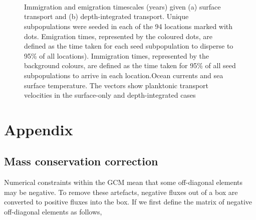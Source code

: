 \documentclass[12pt]{article}
\begin{document}
\begin{figure}[htp]
        \centering
\begin{subfigure}{.66\textwidth}
        \centering
    \end{subfigure}%
    \\
\begin{subfigure}{.66\textwidth}
        \centering
    \end{subfigure}%
    \\~\\
\begin{subfigure}{.66\textwidth}
        \centering
    \end{subfigure}%
    \caption{Immigration and emigration timescales (years) given (a) surface transport and (b) depth-integrated transport. Unique subpopulations were seeded in each of the 94 locations marked with dots. Emigration times, represented by the coloured dots, are defined as the time taken for each seed subpopulation to disperse to 95\% of all locations). Immigration times, represented by the background colours, are defined as the time taken for 95\% of all seed subpopulations to arrive in each location.Ocean currents and sea surface temperature. The vectors show planktonic transport velocities in the surface-only and depth-integrated cases}
\label{}
\end{figure}



\clearpage 

\appendix

\section{Appendix}

\subsection{Mass conservation correction}

Numerical constraints within the GCM mean that some off-diagonal elements may be negative. To remove these artefacts, negative fluxes out of a box are converted to positive fluxes into the box. If we first define the matrix of negative off-diagonal elements as follows,
\end{document}
